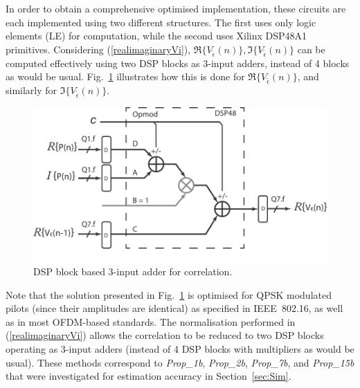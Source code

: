 In order to obtain a comprehensive optimised implementation, these circuits are each implemented using two different structures.
The first uses only logic elements (LE) for computation, while the second uses Xilinx DSP48A1 \cite{ug389} primitives.
Considering (\ref{realimaginaryVi}), $\Re{\{V_{\tilde{\epsilon}}(n)\}}, \Im{\{V_{\tilde{\epsilon}}(n)\}}$ can be computed effectively using two DSP blocks as 3-input adders, instead of 4 blocks as would be usual.
Fig.~\ref{fig:DSP48Acc} illustrates how this is done for $\Re{\{V_{\tilde{\epsilon}}(n)\}}$, and similarly for $\Im{\{V_{\tilde{\epsilon}}(n)\}}$.
\begin{figure}
	\centerline{\includegraphics [width=1\columnwidth] {figures/DSP48Acc.pdf} }
	\caption{DSP block based 3-input adder for correlation.}
	\label{fig:DSP48Acc}
\end{figure}
Note that the solution presented in Fig.~\ref{fig:DSP48Acc} is optimised for QPSK modulated pilots (since their amplitudes are identical) as specified in IEEE~802.16, as well as in most OFDM-based standards.
The normalisation performed in (\ref{realimaginaryVi}) allows the correlation to be reduced to two DSP blocks operating as 3-input adders (instead of 4 DSP blocks with multipliers as would be usual).
These methods correspond to \emph{Prop\_1b}, \emph{Prop\_2b}, \emph{Prop\_7b}, and \emph{Prop\_15b} that were investigated for estimation accuracy in Section~\ref{sec:Sim}.

